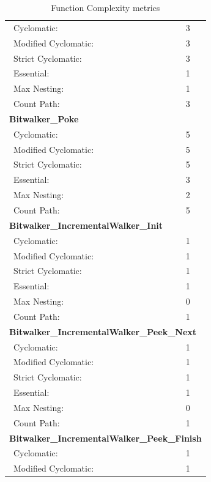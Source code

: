 \begin{longtable}{||p{}|p{}||}
  \caption{Function Complexity metrics}\\
    \hline\hline
    \endhead
    \hline\hline
    \endfoot
\multicolumn{2}{||l||}{\textbf{Bitwalker\_Peek}}
\\\hline
\ Cyclomatic: & 3
\\\hline
\ Modified Cyclomatic: & 3
\\\hline
\ Strict Cyclomatic: & 3
\\\hline
\ Essential: & 1
 \\\hline
\ Max Nesting:   & 1
 \\\hline
\ Count Path: & 3
\\\hline
\multicolumn{2}{||l||}{\textbf{Bitwalker\_Poke}}
\\\hline
\ Cyclomatic: & 5
\\\hline
\ Modified Cyclomatic: & 5
\\\hline
\ Strict Cyclomatic: & 5
\\\hline
\ Essential: & 3
 \\\hline
\ Max Nesting:   & 2
 \\\hline
\ Count Path: & 5
\\\hline
\multicolumn{2}{||l||}{\textbf{Bitwalker\_IncrementalWalker\_Init}}
\\\hline
\ Cyclomatic: & 1
\\\hline
\ Modified Cyclomatic: & 1
\\\hline
\ Strict Cyclomatic: & 1 
\\\hline
\ Essential: & 1
 \\\hline
\ Max Nesting:   & 0
 \\\hline
\ Count Path: & 1
\\\hline
\multicolumn{2}{||l||}{\textbf{Bitwalker\_IncrementalWalker\_Peek\_Next}}
\\\hline
\ Cyclomatic: & 1
\\\hline
\ Modified Cyclomatic: & 1
\\\hline
\ Strict Cyclomatic: & 1 
\\\hline
\ Essential: & 1
 \\\hline
\ Max Nesting:   & 0
 \\\hline
\ Count Path: & 1
\\\hline
\multicolumn{2}{||l||}{\textbf{Bitwalker\_IncrementalWalker\_Peek\_Finish}}
\\\hline
\ Cyclomatic: & 1
\\\hline
\ Modified Cyclomatic: & 1
\\\hline

\end{longtable}
